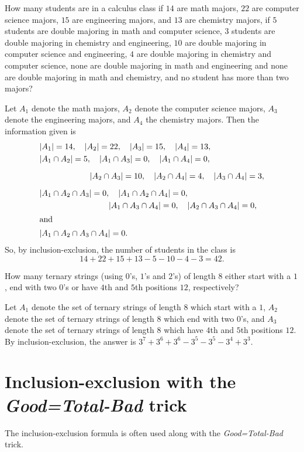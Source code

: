 \begin{exmp}
How many students are in a calculus class if $14$ are math majors, $22$ are computer
science majors, $15$ are engineering majors, and $13$ are chemistry majors, if $5$ students are double majoring
in math and computer science, $3$ students are double majoring in chemistry and engineering, 
$10$ are double majoring in computer science and engineering, $4$ are
double majoring in chemistry and computer science, none are double majoring in math and engineering
and none are double majoring in math and chemistry, and no student has more than two majors?
\end{exmp}
\begin{soln}
Let $A_1$ denote the math majors, $A_2$ denote the computer science majors, $A_3$
denote the engineering majors, and $A_4$ the chemistry majors. Then the information given is
\begin{align*}
&|A_1|=14,\quad |A_2|=22,\quad |A_3|=15,\quad |A_4|=13,\\
 &|A_1\cap A_2|=5,\quad |A_1\cap A_3|=0,\quad |A_1\cap A_4|=0,\\[6pt]
&\phantom{|A_1\cap A_2|=5,}|A_2\cap A_3|=10,\quad |A_2\cap A_4|=4,\quad |A_3\cap A_4|=3,\\[6pt]
&|A_1\cap A_2\cap A_3|=0,\quad |A_1\cap A_2\cap A_4|=0,\\
&\phantom{|A_1\cap A_2\cap A_3|=0,}|A_1\cap A_3\cap A_4|=0,\quad |A_2\cap A_3\cap A_4|=0,\\
\intertext{and}
 &|A_1\cap A_2\cap A_3\cap A_4|=0.
\end{align*}
So, by inclusion-exclusion, the number of students in the class
is 
\[
14+22+15+13-5-10-4-3=42.
\]
\end{soln}

\begin{exmp}
 How many ternary strings (using $0$'s, $1$'s and $2$'s) of length $8$ either start
 with a $1$, end with two $0$'s or have $4$th and $5$th positions $12$, respectively?
\end{exmp}
\begin{soln}
 Let $A_1$ denote the set of ternary strings of length $8$ which start with a $1$,
 $A_2$ denote the set of ternary strings of length $8$ which end with two $0$'s, and $A_3$
 denote the set of ternary strings of length $8$ which have $4$th and $5$th positions $12$. 
 By inclusion-exclusion, the answer is 
 $3^7+3^6+3^6-3^5-3^5-3^4+3^3$.
\end{soln}

\section{Inclusion-exclusion with the \textit{Good=Total-Bad} trick}
The inclusion-exclusion formula is often used along with the \textit{Good=Total-Bad}
trick.

